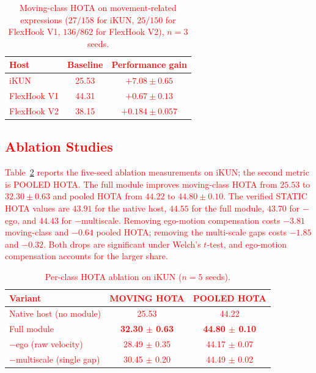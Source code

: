 \documentclass{article}
\begin{document}
\begin{table}
  \centering
  \caption{\textcolor{red}{Moving-class HOTA on movement-related expressions ($27/158$ for iKUN, $25/150$ for FlexHook V1, $136/862$ for FlexHook V2), $n{=}3$ seeds.}}
  \label{tab:deficit}
  \small
  \setlength{\tabcolsep}{2pt}
  \begin{tabular}{lcc}
    \hline
    \textcolor{red}{Host}        & \textcolor{red}{Baseline} & \textcolor{red}{Performance gain} \\
    \hline
    \textcolor{red}{iKUN}        & \textcolor{red}{25.53}    & \textcolor{red}{$+7.08\pm0.65$}   \\
    \textcolor{red}{FlexHook V1} & \textcolor{red}{44.31}    & \textcolor{red}{$+0.67\pm0.13$}   \\
    \textcolor{red}{FlexHook V2} & \textcolor{red}{38.15}    & \textcolor{red}{$+0.184\pm0.057$}   \\
    \hline
  \end{tabular}
\end{table}

\subsection{\textcolor{red}{Ablation Studies}}
\label{sec:ablation}
\textcolor{red}{Table~\ref{tab:ablation} reports the five-seed ablation measurements on iKUN; the second metric is POOLED HOTA. The full module improves moving-class HOTA from $25.53$ to $32.30\pm0.63$ and pooled HOTA from $44.22$ to $44.80\pm0.10$. The verified STATIC HOTA values are $43.91$ for the native host, $44.55$ for the full module, $43.70$ for $-$ego, and $44.43$ for $-$multiscale. Removing ego-motion compensation costs $-3.81$ moving-class and $-0.64$ pooled HOTA; removing the multi-scale gaps costs $-1.85$ and $-0.32$. Both drops are significant under Welch's $t$-test, and ego-motion compensation accounts for the larger share.}

\begin{table}
  \centering
  \caption{\textcolor{red}{Per-class HOTA ablation on iKUN ($n{=}5$ seeds).}}
  \label{tab:ablation}
  \small
  \setlength{\tabcolsep}{2pt}
  \begin{tabular}{lcc}
    \hline
    \textcolor{red}{Variant}                    & \textcolor{red}{MOVING HOTA}               & \textcolor{red}{POOLED HOTA}               \\
    \hline
    \textcolor{red}{Native host (no module)}    & \textcolor{red}{25.53}                     & \textcolor{red}{44.22}                     \\
    \textcolor{red}{Full module}                & \textcolor{red}{\textbf{32.30 $\pm$ 0.63}} & \textcolor{red}{\textbf{44.80 $\pm$ 0.10}} \\
    \textcolor{red}{$-$ego (raw velocity)}      & \textcolor{red}{28.49 $\pm$ 0.35}          & \textcolor{red}{44.17 $\pm$ 0.07}          \\
    \textcolor{red}{$-$multiscale (single gap)} & \textcolor{red}{30.45 $\pm$ 0.20}          & \textcolor{red}{44.49 $\pm$ 0.02}          \\
    \hline
  \end{tabular}
\end{table}
\end{document}
